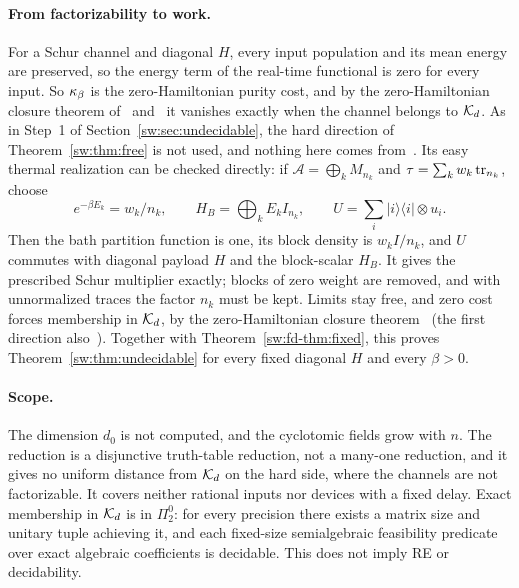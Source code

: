 \paragraph{From factorizability to work.}
For a Schur channel and diagonal $H$, every input population and its mean energy are preserved, so the energy term of the real-time functional is zero for every input. So $\kappa_\beta$ is the zero-Hamiltonian purity cost, and by the zero-Hamiltonian closure theorem of~\cite[Thm.~3.2(a)]{Memory} and~\cite{Douglas26closed} it vanishes exactly when the channel belongs to $\mathcal K_d$. As in Step~1 of Section~\ref{sw:sec:undecidable}, the hard direction of Theorem~\ref{sw:thm:free} is not used, and nothing here comes from~\cite{FMS}. Its easy thermal realization can be checked directly: if
$\mathcal A=\bigoplus_kM_{n_k}$ and $\tau=\sum_kw_k\operatorname{tr}_{n_k}$, choose
\[
e^{-\beta E_k}=w_k/n_k,\qquad H_B=\bigoplus_kE_kI_{n_k},\qquad
U=\sum_i|i\rangle\langle i|\otimes u_i.
\]
Then the bath partition function is one, its block density is $w_kI/n_k$, and $U$ commutes with diagonal payload $H$ and the block-scalar $H_B$. It gives the prescribed Schur multiplier exactly; blocks of zero weight are removed, and with unnormalized traces the factor $n_k$ must be kept. Limits stay free, and zero cost forces membership in $\mathcal K_d$, by the zero-Hamiltonian closure theorem~\cite[Thm.~3.2(a)]{Memory} (the first direction also~\cite[Sec.~8]{Douglas26closed}). Together with Theorem~\ref{sw:fd-thm:fixed}, this proves Theorem~\ref{sw:thm:undecidable} for every fixed diagonal $H$ and every $\beta>0$.

\paragraph{Scope.}
The dimension $d_0$ is not computed, and the cyclotomic fields grow with $n$. The reduction is a disjunctive truth-table reduction, not a many-one reduction, and it gives no uniform distance from $\mathcal K_d$ on the hard side, where the channels are not factorizable. It covers neither rational inputs nor devices with a fixed delay. Exact membership in $\mathcal K_d$ is in $\Pi^0_2$: for every precision there exists a matrix size and unitary tuple achieving it, and each fixed-size semialgebraic feasibility predicate over exact algebraic coefficients is decidable. This does not imply RE or decidability.

